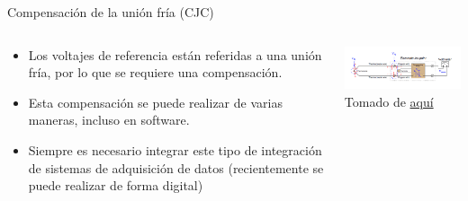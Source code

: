 \documentclass[aspectratio=169]{beamer}
\begin{document}
\begin{frame}{Compensación de la unión fría (CJC)}
 \begin{columns}[c, onlytextwidth]
        \begin{column}{0.45\textwidth}
            \begin{itemize}
                \item Los voltajes de referencia están referidas a una unión fría, por lo que se requiere una compensación.  
                \item Esta compensación se puede realizar de varias maneras, incluso en software. 
                \item Siempre es necesario integrar este tipo de integración de sistemas de adquisición de datos (recientemente se puede realizar de forma digital)
            \end{itemize}
        \end{column}
        \begin{column}{0.5\textwidth}
            \includegraphics[width=8.5cm]{fig/Thermocouple_cjc.png}
            \\ \tiny{Tomado de \href{https://forumautomation.com/t/what-is-cold-junction-compensation-in-thermocouple/2896}{aquí}}
        \end{column}
    \end{columns}
\end{frame}
\end{document}
